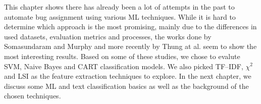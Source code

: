 This chapter shows there has already been a lot of attempts in the past to automate bug assignment using various ML techniques. While it is hard to determine which approach is the most promising, mainly due to the differences in used datasets, evaluation metrics and processes, the works done by Somasundaram and Murphy and more recently by Thung at al. seem to show the most interesting results. Based on some of these studies, we chose to evalute SVM, Naive Bayes and CART classification models. We also picked TF--IDF, $\chi^2$ and LSI as the feature extraction techniques to explore. In the next chapter, we discuss some ML and text classification basics as well as the background of the chosen techniques.
